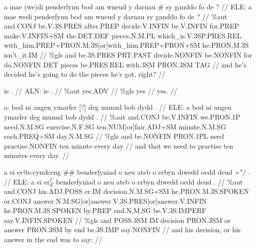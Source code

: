 \documentclass[a4paper,10pt]{article}
\begin{document}
\ex
\begingl[lingstyle=gergl]
\glchat a mae (we)di penderfynu bod am wneud y darnau \# sy ganddo fo de ? //
\glsurface ELE:  a mae wedi penderfynu bod am wneud y darnau sy ganddo fo de ?  //
\glauto \%aut  and{\scriptsize .CONJ} be{\scriptsize .V.3S.PRES} after{\scriptsize .PREP} decide{\scriptsize .V.INFIN} be{\scriptsize .V.INFIN} for{\scriptsize .PREP} make{\scriptsize .V.INFIN+SM} the{\scriptsize .DET.DEF} pieces{\scriptsize .N.M.PL} which\_is{\scriptsize .V.3SP.PRES.REL} with\_him{\scriptsize .PREP+PRON.M.3S[or]with\_him.PREP+PRON+SM} he{\scriptsize .PRON.M.3S} isn't\_it{\scriptsize .IM}   //
\glmanual \%gls  and be{\scriptsize .3S.PRES} PRT{\scriptsize .PAST} decide{\scriptsize .NONFIN} be{\scriptsize .NONFIN} for do{\scriptsize .NONFIN} DET pieces be{\scriptsize .PRES.REL} with{\scriptsize .3SM} PRON{\scriptsize .3SM} TAG   //
\gleng and he's decided he's going to do the pieces he's got, right? //
\endgl
\xe

\ex
\begingl[lingstyle=gergl]
\glchat ie . //
\glsurface ALN:  ie .  //
\glauto \%aut  yes{\scriptsize .ADV}   //
\glmanual \%gls  yes   //
\gleng yes. //
\endgl
\xe

\ex
\begingl[lingstyle=gergl]
\glchat a: bod ni angen ymarfer [?] deg munud bob dydd . //
\glsurface ELE:  a bod ni angen ymarfer deg munud bob dydd .  //
\glauto \%aut  and{\scriptsize .CONJ} be{\scriptsize .V.INFIN} we{\scriptsize .PRON.1P} need{\scriptsize .N.M.SG} exercise{\scriptsize .N.F.SG} ten{\scriptsize .NUM[or]fair.ADJ+SM} minute{\scriptsize .N.M.SG} each{\scriptsize .PREQ+SM} day{\scriptsize .N.M.SG}   //
\glmanual \%gls  and be{\scriptsize .NONFIN} PRON{\scriptsize .1PL} need practise{\scriptsize .NONFIN} ten minute every day   //
\gleng and that we need to practise ten minutes every day. //
\endgl
\xe

\ex
\begingl[lingstyle=gergl]
\glchat a ei er@s:cym\&eng \#\# benderfyniad o neu ateb o erbyn diwedd oedd deud +"/ . //
\glsurface ELE:  a ei er$^{C}_{E}$ benderfyniad o neu ateb o erbyn diwedd oedd deud .  //
\glauto \%aut  and{\scriptsize .CONJ} his{\scriptsize .ADJ.POSS} er{\scriptsize .IM} decision{\scriptsize .N.M.SG+SM} he{\scriptsize .PRON.M.3S.SPOKEN} or{\scriptsize .CONJ} answer{\scriptsize .N.M.SG[or]answer.V.3S.PRES[or]answer.V.INFIN} he{\scriptsize .PRON.M.3S.SPOKEN} by{\scriptsize .PREP} end{\scriptsize .N.M.SG} be{\scriptsize .V.3S.IMPERF} say{\scriptsize .V.INFIN.SPOKEN}   //
\glmanual \%gls  and POSS{\scriptsize .3SM} IM decision PRON{\scriptsize .3SM} or answer PRON{\scriptsize .3SM} by end be{\scriptsize .3S.IMP} say{\scriptsize .NONFIN}   //
\gleng and his decision, or his answer in the end was to say: //
\endgl
\xe
\end{document}
